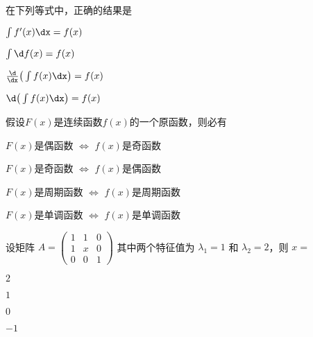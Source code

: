 \documentclass{jnuexam}
\begin{document}
\vfill

\newpagea %



\newpageb %

\begin{problem}
在下列等式中，正确的结果是
\begin{abcd}
\item $\int f'(x)\dx=f(x)$
\item $\int \d f(x)=f(x)$
\item $\frac{\d}{\dx}\big(\int f(x)\dx\big)=f(x)$
\item $\d\big(\int f(x)\dx\big)=f(x)$
\end{abcd}
\end{problem}

\bigskip

\begin{problem}
假设$F(x)$是连续函数$f(x)$的一个原函数，则必有
\begin{abcd}
\item $F(x)$是偶函数 $\Leftrightarrow$ $f(x)$是奇函数
\item $F(x)$是奇函数 $\Leftrightarrow$ $f(x)$是偶函数
\item $F(x)$是周期函数 $\Leftrightarrow$ $f(x)$是周期函数
\item $F(x)$是单调函数 $\Leftrightarrow$ $f(x)$是单调函数
\end{abcd}
\end{problem}

\bigskip

\begin{problem}
设矩阵 $A = \left(\begin{array}{ccc}
  1 & 1 & 0\\
  1 & x & 0\\
  0 & 0 & 1
\end{array}\right)$ 其中两个特征值为 $\lambda_1 = 1$ 和 $\lambda_2
= 2$，则 $x=$ 
\begin{abcd}
\item $2$
\item $1$
\item $0$
\item $-1$
\end{abcd}
\end{problem}

\bigskip
\end{document}
